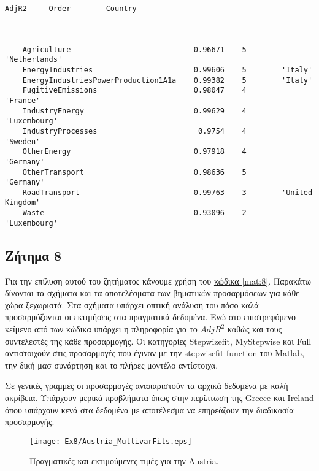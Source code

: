\documentclass[11pt]{scrartcl} %
\begin{document}
\begin{Verbatim}[fontsize=\small]
                                            AdjR2     Order        Country     
                                           _______    _____    ________________

    Agriculture                            0.96671    5        'Netherlands'   
    EnergyIndustries                       0.99606    5        'Italy'         
    EnergyIndustriesPowerProduction1A1a    0.99382    5        'Italy'         
    FugitiveEmissions                      0.98047    4        'France'        
    IndustryEnergy                         0.99629    4        'Luxembourg'    
    IndustryProcesses                       0.9754    4        'Sweden'        
    OtherEnergy                            0.97918    4        'Germany'       
    OtherTransport                         0.98636    5        'Germany'       
    RoadTransport                          0.99763    3        'United Kingdom'
    Waste                                  0.93096    2        'Luxembourg'
\end{Verbatim}


\subsection{Ζήτημα 8}
\label{subsec:z8}

Για την επίλυση αυτού του ζητήματος κάνουμε χρήση του \hyperref[mat:8]{κώδικα \ref*{mat:8}}. Παρακάτω δίνονται τα σχήματα και τα αποτελέσματα των βηματικών προσαρμόσεων για κάθε χώρα ξεχωριστά. Στα σχήματα υπάρχει οπτική ανάλυση του πόσο καλά προσαρμόζονται οι εκτιμήσεις στα πραγματικά δεδομένα. Ενώ στο επιστρεφόμενο κείμενο από των κώδικα υπάρχει η πληροφορία για το $AdjR^2$ καθώς και τους συντελεστές της κάθε προσαρμογής. Οι κατηγορίες Stepwizefit, MyStepwise και Full αντιστοιχούν στις προσαρμογές που έγιναν με την stepwisefit function του Matlab, την δική μασ συνάρτηση και το πλήρες μοντέλο αντίστοιχα.

Σε γενικές γραμμές οι προσαρμογές αναπαριστούν τα αρχικά δεδομένα με καλή ακρίβεια. Υπάρχουν μερικά προβλήματα όπως στην περίπτωση της Greece και Ireland όπου υπάρχουν κενά στα δεδομένα με αποτέλεσμα να επηρεάζουν την διαδικασία προσαρμογής. 


\begin{figure}[H]

	\centering
	\texttt{[image: Ex8/Austria\_MultivarFits.eps]}	
\caption{Πραγματικές και εκτιμούμενες τιμές για την Austria.}
\label{fig:z81} 
\end{figure}
\end{document}
